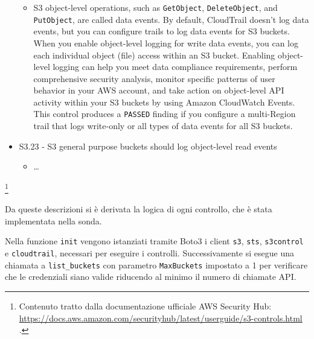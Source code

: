 \begin{mdframed}[backgroundcolor=gray!05, linecolor=gray!50]
\begin{itemize}
\begin{itemize}
        \item S3 object-level operations, such as \texttt{GetObject}, \texttt{DeleteObject}, and \texttt{PutObject}, are called data events. By default, CloudTrail doesn't log data events, but you can configure trails to log data events for S3 buckets. When you enable object-level logging for write data events, you can log each individual object (file) access within an S3 bucket. Enabling object-level logging can help you meet data compliance requirements, perform comprehensive security analysis, monitor specific patterns of user behavior in your AWS account, and take action on object-level API activity within your S3 buckets by using Amazon CloudWatch Events. This control produces a \texttt{PASSED} finding if you configure a multi-Region trail that logs write-only or all types of data events for all S3 buckets.
    \end{itemize}
    \item S3.23 - S3 general purpose buckets should log object-level read events
    \begin{itemize}
        \item \dots
    \end{itemize}
\end{itemize}
\end{mdframed}

\footnote{Contenuto tratto dalla documentazione ufficiale AWS Security Hub: \url{https://docs.aws.amazon.com/securityhub/latest/userguide/s3-controls.html} .}

Da queste descrizioni si è derivata la logica di ogni controllo, che è stata implementata nella sonda.

Nella funzione \texttt{init} vengono istanziati tramite Boto3 i client \texttt{s3}, \texttt{sts}, \texttt{s3control} e \texttt{cloudtrail}, necessari per eseguire i controlli. Successivamente si esegue una chiamata a \texttt{list\_buckets} con parametro \texttt{MaxBuckets} impostato a 1 per verificare che le credenziali siano valide riducendo al minimo il numero di chiamate API. 

